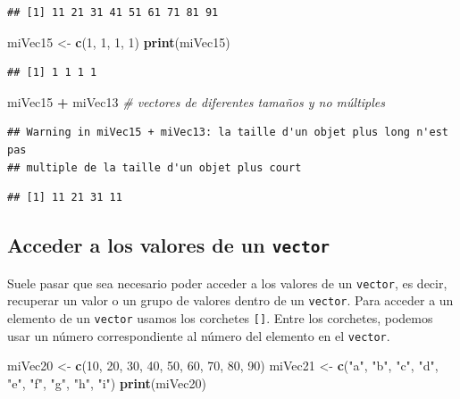 \documentclass[]{book}
\newenvironment{Shaded}{\begin{snugshade}}{\end{snugshade}}
\newcommand{\KeywordTok}[1]{\textcolor[rgb]{0.13,0.29,0.53}{\textbf{#1}}}
\newcommand{\DecValTok}[1]{\textcolor[rgb]{0.00,0.00,0.81}{#1}}
\newcommand{\StringTok}[1]{\textcolor[rgb]{0.31,0.60,0.02}{#1}}
\newcommand{\CommentTok}[1]{\textcolor[rgb]{0.56,0.35,0.01}{\textit{#1}}}
\newcommand{\OperatorTok}[1]{\textcolor[rgb]{0.81,0.36,0.00}{\textbf{#1}}}
\newcommand{\NormalTok}[1]{#1}
\begin{document}
\begin{verbatim}
## [1] 11 21 31 41 51 61 71 81 91
\end{verbatim}

\begin{Shaded}
\begin{Highlighting}[]
\NormalTok{miVec15 <-}\StringTok{ }\KeywordTok{c}\NormalTok{(}\DecValTok{1}\NormalTok{, }\DecValTok{1}\NormalTok{, }\DecValTok{1}\NormalTok{, }\DecValTok{1}\NormalTok{)}
\KeywordTok{print}\NormalTok{(miVec15)}
\end{Highlighting}
\end{Shaded}

\begin{verbatim}
## [1] 1 1 1 1
\end{verbatim}

\begin{Shaded}
\begin{Highlighting}[]
\NormalTok{miVec15 }\OperatorTok{+}\StringTok{ }\NormalTok{miVec13 }\CommentTok{# vectores de diferentes tamaños y no múltiples}
\end{Highlighting}
\end{Shaded}

\begin{verbatim}
## Warning in miVec15 + miVec13: la taille d'un objet plus long n'est pas
## multiple de la taille d'un objet plus court
\end{verbatim}

\begin{verbatim}
## [1] 11 21 31 11
\end{verbatim}

\subsection{\texorpdfstring{Acceder a los valores de un
\texttt{vector}}{Acceder a los valores de un vector}}\label{acceder-a-los-valores-de-un-vector}

Suele pasar que sea necesario poder acceder a los valores de un
\texttt{vector}, es decir, recuperar un valor o un grupo de valores
dentro de un \texttt{vector}. Para acceder a un elemento de un
\texttt{vector} usamos los corchetes \texttt{{[}{]}}. Entre los
corchetes, podemos usar un número correspondiente al número del elemento
en el \texttt{vector}.

\begin{Shaded}
\begin{Highlighting}[]
\NormalTok{miVec20 <-}\StringTok{ }\KeywordTok{c}\NormalTok{(}\DecValTok{10}\NormalTok{, }\DecValTok{20}\NormalTok{, }\DecValTok{30}\NormalTok{, }\DecValTok{40}\NormalTok{, }\DecValTok{50}\NormalTok{, }\DecValTok{60}\NormalTok{, }\DecValTok{70}\NormalTok{, }\DecValTok{80}\NormalTok{, }\DecValTok{90}\NormalTok{)}
\NormalTok{miVec21 <-}\StringTok{ }\KeywordTok{c}\NormalTok{(}\StringTok{"a"}\NormalTok{, }\StringTok{"b"}\NormalTok{, }\StringTok{"c"}\NormalTok{, }\StringTok{"d"}\NormalTok{, }\StringTok{"e"}\NormalTok{, }\StringTok{"f"}\NormalTok{, }\StringTok{"g"}\NormalTok{, }\StringTok{"h"}\NormalTok{, }\StringTok{"i"}\NormalTok{)}
\KeywordTok{print}\NormalTok{(miVec20)}
\end{Highlighting}
\end{Shaded}
\end{document}

